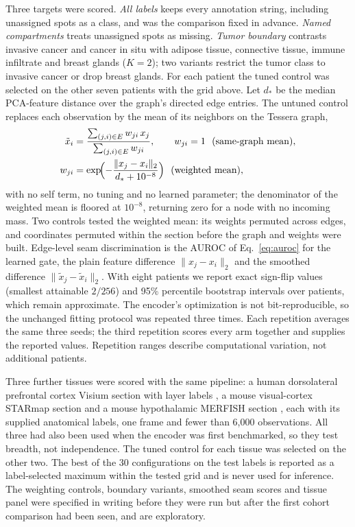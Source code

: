 \documentclass[11pt]{article}
\begin{document}
Three targets were scored. \emph{All labels} keeps every annotation string, including unassigned spots as a class, and was the comparison fixed in advance. \emph{Named compartments} treats unassigned spots as missing. \emph{Tumor boundary} contrasts invasive cancer and cancer in situ with adipose tissue, connective tissue, immune infiltrate and breast glands (\(K=2\)); two variants restrict the tumor class to invasive cancer or drop breast glands. For each patient the tuned control was selected on the other seven patients with the grid above. Let \(d_*\) be the median PCA-feature distance over the graph's directed edge entries. The untuned control replaces each observation by the mean of its neighbors on the Tessera graph,
\begin{align}
\tilde x_i&=\frac{\sum_{(j,i)\in E}w_{ji}\,x_j}{\sum_{(j,i)\in E}w_{ji}},\qquad w_{ji}=1\ \ (\text{same-graph mean}),\nonumber\\
w_{ji}&=\exp\!\Bigl(-\frac{\lVert x_j-x_i\rVert_2}{d_*+10^{-8}}\Bigr)\ \ (\text{weighted mean}),\label{eq:neighborhood}
\end{align}
with no self term, no tuning and no learned parameter; the denominator of the weighted mean is floored at \(10^{-8}\), returning zero for a node with no incoming mass. Two controls tested the weighted mean: its weights permuted across edges, and coordinates permuted within the section before the graph and weights were built. Edge-level seam discrimination is the AUROC of Eq.~\eqref{eq:auroc} for the learned gate, the plain feature difference \(\lVert x_j-x_i\rVert_2\) and the smoothed difference \(\lVert\tilde x_j-\tilde x_i\rVert_2\). With eight patients we report exact sign-flip values (smallest attainable \(2/256\)) and 95\% percentile bootstrap intervals over patients, which remain approximate. The encoder's optimization is not bit-reproducible, so the unchanged fitting protocol was repeated three times. Each repetition averages the same three seeds; the third repetition scores every arm together and supplies the reported values. Repetition ranges describe computational variation, not additional patients.

Three further tissues were scored with the same pipeline: a human dorsolateral prefrontal cortex Visium section with layer labels \citep{maynard2021dlpfc}, a mouse visual-cortex STARmap section \citep{wang2018starmap} and a mouse hypothalamic MERFISH section \citep{moffitt2018merfish}, each with its supplied anatomical labels, one frame and fewer than 6,000 observations. All three had also been used when the encoder was first benchmarked, so they test breadth, not independence. The tuned control for each tissue was selected on the other two. The best of the 30 configurations on the test labels is reported as a label-selected maximum within the tested grid and is never used for inference. The weighting controls, boundary variants, smoothed seam scores and tissue panel were specified in writing before they were run but after the first cohort comparison had been seen, and are exploratory.
\end{document}

